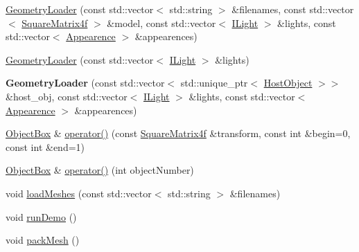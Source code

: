 \begin{DoxyCompactItemize}
\item 
\hyperlink{class_geometry_loader_acdbb37e0f355aec4bd1c43315ca062de}{Geometry\+Loader} (const std\+::vector$<$ std\+::string $>$ \&filenames, const std\+::vector$<$ \hyperlink{class_square_matrix4}{Square\+Matrix4f} $>$ \&model, const std\+::vector$<$ \hyperlink{class_i_light}{I\+Light} $>$ \&lights, const std\+::vector$<$ \hyperlink{struct_appearence}{Appearence} $>$ \&appearences)
\item 
\hyperlink{class_geometry_loader_ad1e31702fc39f0fcc216beca12967872}{Geometry\+Loader} (const std\+::vector$<$ \hyperlink{class_i_light}{I\+Light} $>$ \&lights)
\item 
{\bfseries Geometry\+Loader} (const std\+::vector$<$ std\+::unique\+\_\+ptr$<$ \hyperlink{class_host_object}{Host\+Object} $>$$>$ \&host\+\_\+obj, const std\+::vector$<$ \hyperlink{class_i_light}{I\+Light} $>$ \&lights, const std\+::vector$<$ \hyperlink{struct_appearence}{Appearence} $>$ \&appearences)\hypertarget{class_geometry_loader_a0fba129ffcc51352ce49d22d30e83732}{}\label{class_geometry_loader_a0fba129ffcc51352ce49d22d30e83732}

\item 
\hyperlink{class_object_box}{Object\+Box} \& \hyperlink{class_geometry_loader_a99722ce01101349a6c792e87cc488d36}{operator()} (const \hyperlink{class_square_matrix4}{Square\+Matrix4f} \&transform, const int \&begin=0, const int \&end=1)
\item 
\hyperlink{class_object_box}{Object\+Box} \& \hyperlink{class_geometry_loader_a71c1d727c3939d3e4de530d8a4504687}{operator()} (int object\+Number)
\item 
void \hyperlink{class_geometry_loader_a41504f514cf9aed65d385e401ae2de22}{load\+Meshes} (const std\+::vector$<$ std\+::string $>$ \&filenames)
\item 
void \hyperlink{class_geometry_loader_ae12a7d2e1dddd53e79cf42edf7ce59d6}{run\+Demo} ()
\item 
void \hyperlink{class_geometry_loader_a9ee90083c2f62768f8a2c613fdcf0715}{pack\+Mesh} ()\hypertarget{class_geometry_loader_a9ee90083c2f62768f8a2c613fdcf0715}{}\label{class_geometry_loader_a9ee90083c2f62768f8a2c613fdcf0715}


\end{DoxyCompactItemize}
